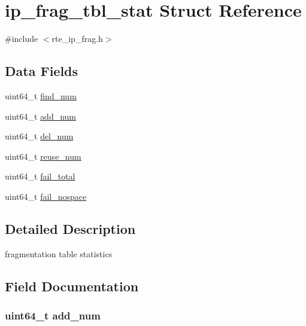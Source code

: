 \hypertarget{structip__frag__tbl__stat}{}\section{ip\+\_\+frag\+\_\+tbl\+\_\+stat Struct Reference}
\label{structip__frag__tbl__stat}


{\ttfamily \#include $<$rte\+\_\+ip\+\_\+frag.\+h$>$}

\subsection*{Data Fields}
\begin{DoxyCompactItemize}
\item 
uint64\+\_\+t \hyperlink{structip__frag__tbl__stat_acb8aad396c4da244c3da7858b23296a9}{find\+\_\+num}
\item 
uint64\+\_\+t \hyperlink{structip__frag__tbl__stat_ac00b1f70a1ca6af312372b691b4351ca}{add\+\_\+num}
\item 
uint64\+\_\+t \hyperlink{structip__frag__tbl__stat_abf11b6a21840e57c393c2011a29e37fc}{del\+\_\+num}
\item 
uint64\+\_\+t \hyperlink{structip__frag__tbl__stat_a313c5e12dac5182293b7d202e5be36e5}{reuse\+\_\+num}
\item 
uint64\+\_\+t \hyperlink{structip__frag__tbl__stat_a5d345175f24e51ef3e82caa9a29211cc}{fail\+\_\+total}
\item 
uint64\+\_\+t \hyperlink{structip__frag__tbl__stat_a7c1bf4c99fc9c7c9b97a54ae5e3cd149}{fail\+\_\+nospace}
\end{DoxyCompactItemize}


\subsection{Detailed Description}
fragmentation table statistics 

\subsection{Field Documentation}
\hypertarget{structip__frag__tbl__stat_ac00b1f70a1ca6af312372b691b4351ca}{}
\subsubsection[{add\+\_\+num}]{\setlength{\rightskip}{0pt plus 5cm}uint64\+\_\+t add\+\_\+num}\label{structip__frag__tbl__stat_ac00b1f70a1ca6af312372b691b4351ca}
